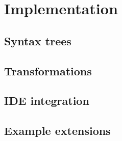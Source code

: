 \chapter{Implementation}

\section{Syntax trees}

\section{Transformations}

\section{IDE integration}

\section{Example extensions}